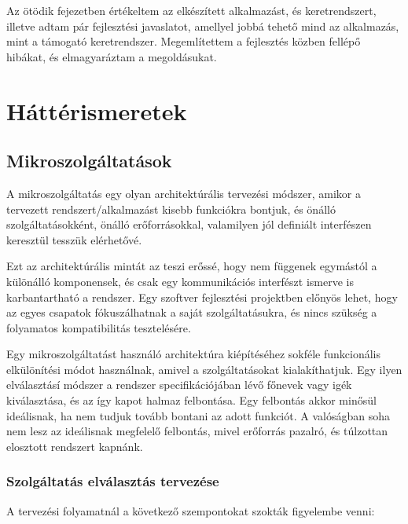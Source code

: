 \documentclass[11pt,magyar,a4paper,twoside,]{report}
\begin{document}
Az ötödik fejezetben értékeltem az elkészített alkalmazást, és
keretrendszert, illetve adtam pár fejlesztési javaslatot, amellyel jobbá
tehető mind az alkalmazás, mint a támogató keretrendszer. Megemlítettem
a fejlesztés közben fellépő hibákat, és elmagyaráztam a megoldásukat.

\chapter{Háttérismeretek}\label{huxe1ttuxe9rismeretek}

\section{Mikroszolgáltatások}\label{mikroszolguxe1ltatuxe1sok}

A mikroszolgáltatás\citep{microservices} \citep{micro-arch}
\citep{microservices-light} egy olyan architektúrális tervezési módszer,
amikor a tervezett rendszert/alkalmazást kisebb funkciókra bontjuk, és
önálló szolgáltatásokként, önálló erőforrásokkal, valamilyen jól
definiált interfészen keresztül tesszük elérhetővé.

Ezt az architektúrális mintát az teszi erőssé, hogy nem függenek
egymástól a különálló komponensek, és csak egy kommunikációs interfészt
ismerve is karbantartható a rendszer. Egy szoftver fejlesztési
projektben előnyös lehet, hogy az egyes csapatok fókuszálhatnak a saját
szolgáltatásukra, és nincs szükség a folyamatos kompatibilitás
tesztelésére.

Egy mikroszolgáltatást használó architektúra kiépítéséhez sokféle
funkcionális elkülönítési módot használnak, amivel a szolgáltatásokat
kialakíthatjuk. Egy ilyen elválasztásí módszer a rendszer
specifikációjában lévő főnevek vagy igék kiválasztása, és az így kapot
halmaz felbontása. Egy felbontás akkor minősül ideálisnak, ha nem tudjuk
tovább bontani az adott funkciót. A valóságban soha nem lesz az
ideálisnak megfelelő felbontás, mivel erőforrás pazalró, és túlzottan
elosztott rendszert kapnánk.

\subsection{\texorpdfstring{Szolgáltatás elválasztás
tervezése\label{splitting}}{Szolgáltatás elválasztás tervezése}}\label{szolguxe1ltatuxe1s-elvuxe1lasztuxe1s-tervezuxe9se}

A tervezési folyamatnál a következő szempontokat szokták figyelembe
venni:
\end{document}
